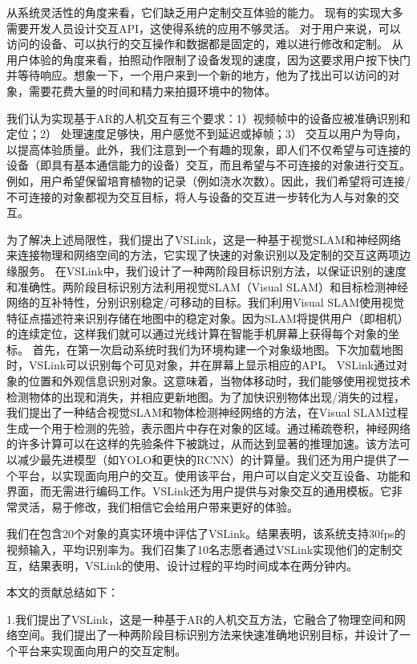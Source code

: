 从系统灵活性的角度来看，它们缺乏用户定制交互体验的能力。
现有的实现大多需要开发人员设计交互API，这使得系统的应用不够灵活。
对于用户来说，可以访问的设备、可以执行的交互操作和数据都是固定的，难以进行修改和定制。
从用户体验的角度来看，拍照动作限制了设备发现的速度，因为这要求用户按下快门并等待响应。想象一下，一个用户来到一个新的地方，他为了找出可以访问的对象，需要花费大量的时间和精力来拍摄环境中的物体。

我们认为实现基于AR的人机交互有三个要求：1）视频帧中的设备应被准确识别和定位；2） 处理速度足够快，用户感觉不到延迟或掉帧；3） 交互以用户为导向，以提高体验质量。此外，我们注意到一个有趣的现象，即人们不仅希望与可连接的设备（即具有基本通信能力的设备）交互，而且希望与不可连接的对象进行交互。例如，用户希望保留培育植物的记录（例如浇水次数）。因此，我们希望将可连接/不可连接的对象都视为交互目标，将人与设备的交互进一步转化为人与对象的交互。

为了解决上述局限性，我们提出了VSLink，这是一种基于视觉SLAM和神经网络来连接物理和网络空间的方法，它实现了快速的对象识别以及定制的交互这两项边缘服务。
在VSLink中，我们设计了一种两阶段目标识别方法，以保证识别的速度和准确性。两阶段目标识别方法利用视觉SLAM（Visual SLAM）和目标检测神经网络的互补特性，分别识别稳定/可移动的目标。我们利用Visual SLAM使用视觉特征点描述符来识别存储在地图中的稳定对象。因为SLAM将提供用户（即相机）的连续定位，这样我们就可以通过光线计算在智能手机屏幕上获得每个对象的坐标。
首先，在第一次启动系统时我们为环境构建一个对象级地图。下次加载地图时，VSLink可以识别每个可见对象，并在屏幕上显示相应的API。
VSLink通过对象的位置和外观信息识别对象。这意味着，当物体移动时，我们能够使用视觉技术检测物体的出现和消失，并相应更新地图。为了加快识别物体出现/消失的过程，我们提出了一种结合视觉SLAM和物体检测神经网络的方法，在Visual SLAM过程生成一个用于检测的先验，表示图片中存在对象的区域。通过稀疏卷积\cite{ren2018sbnet}，神经网络的许多计算可以在这样的先验条件下被跳过，从而达到显著的推理加速。该方法可以减少最先进模型（如YOLO和更快的RCNN）的计算量。我们还为用户提供了一个平台，以实现面向用户的交互。使用该平台，用户可以自定义交互设备、功能和界面，而无需进行编码工作。VSLink还为用户提供与对象交互的通用模板。它非常灵活，易于修改，我们相信它会给用户带来更好的体验。

我们在包含20个对象的真实环境中评估了VSLink。结果表明，该系统支持30fps的视频输入，平均识别率为{\acc}。我们召集了10名志愿者通过VSLink实现他们的定制交互，结果表明，VSLink的使用、设计过程的平均时间成本在两分钟内。

本文的贡献总结如下：

1.我们提出了VSLink，这是一种基于AR的人机交互方法，它融合了物理空间和网络空间。我们提出了一种两阶段目标识别方法来快速准确地识别目标，并设计了一个平台来实现面向用户的交互定制。

